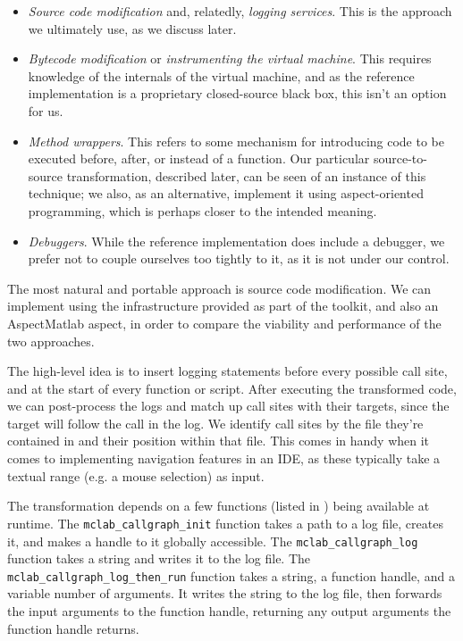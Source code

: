 \begin{itemize}
\item \emph{Source code modification} and, relatedly, \emph{logging services}.
This is the approach we ultimately use, as we discuss later.
\item \emph{Bytecode modification} or \emph{instrumenting the virtual machine}.
This requires knowledge of the internals of the \matlab virtual machine, and as
the reference \matlab implementation is a proprietary closed-source black box,
this isn't an option for us.
\item \emph{Method wrappers}. This refers to some mechanism for introducing
code to be executed before, after, or instead of a function. Our particular
source-to-source transformation, described later, can be seen of an instance of
this technique; we also, as an alternative, implement it using aspect-oriented
programming, which is perhaps closer to the intended meaning.
\item \emph{Debuggers}. While the reference \matlab implementation does include
a debugger, we prefer not to couple ourselves too tightly to it, as it is not
under our control.
\end{itemize}

The most natural and portable approach is source code modification. We can
implement using the infrastructure provided as part of the \mclab toolkit, and
also an AspectMatlab aspect, in order to compare the viability and performance
of the two approaches.

The high-level idea is to insert logging statements before every possible call
site, and at the start of every function or script. After executing the
transformed code, we can post-process the logs and match up call sites with
their targets, since the target will follow the call in the log. We identify
call sites by the file they're contained in and their position within that
file. This comes in handy when it comes to implementing navigation features in
an IDE, as these typically take a textual range (e.g. a mouse selection) as
input.

The transformation depends on a few functions (listed in
) being available at runtime. The
\texttt{mclab\_callgraph\_init} function takes a path to a log file, creates it, and
makes a handle to it globally accessible. The \texttt{mclab\_callgraph\_log} function
takes a string and writes it to the log file. The
\texttt{mclab\_callgraph\_log\_then\_run} function takes a string, a function handle,
and a variable number of arguments. It writes the string to the log file, then
forwards the input arguments to the function handle, returning any output
arguments the function handle returns.

